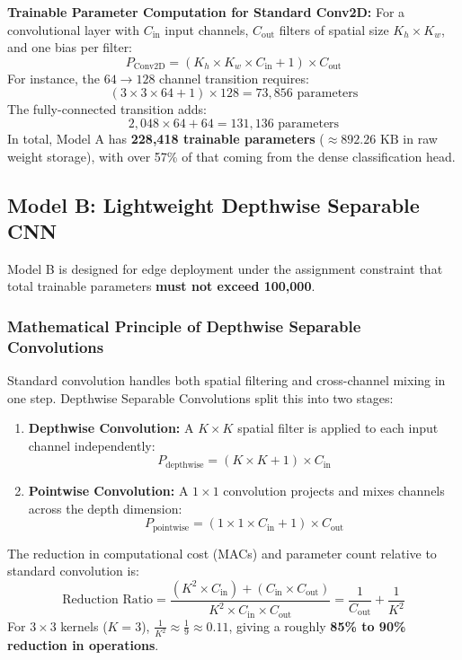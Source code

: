 \documentclass[11pt]{article}
\begin{document}
	\textbf{Trainable Parameter Computation for Standard Conv2D:}
	For a convolutional layer with $C_{\text{in}}$ input channels, $C_{\text{out}}$ filters of spatial size $K_h \times K_w$, and one bias per filter:
	\begin{equation}
		P_{\text{Conv2D}} = (K_h \times K_w \times C_{\text{in}} + 1) \times C_{\text{out}}
	\end{equation}
	For instance, the $64 \to 128$ channel transition requires:
	$$(3 \times 3 \times 64 + 1) \times 128 = 73,856 \text{ parameters}$$
	The fully-connected transition adds:
	$$2,048 \times 64 + 64 = 131,136 \text{ parameters}$$
	In total, Model A has \textbf{228,418 trainable parameters} ($\approx 892.26\text{ KB}$ in raw weight storage), with over 57\% of that coming from the dense classification head.

	\subsection{Model B: Lightweight Depthwise Separable CNN}
	Model B is designed for edge deployment under the assignment constraint that total trainable parameters \textbf{must not exceed 100,000}.
	
	\subsubsection{Mathematical Principle of Depthwise Separable Convolutions}
	Standard convolution handles both spatial filtering and cross-channel mixing in one step. Depthwise Separable Convolutions split this into two stages:
	\begin{enumerate}
		\item \textbf{Depthwise Convolution:} A $K \times K$ spatial filter is applied to each input channel independently:
		\begin{equation}
			P_{\text{depthwise}} = (K \times K + 1) \times C_{\text{in}}
		\end{equation}
		\item \textbf{Pointwise Convolution:} A $1 \times 1$ convolution projects and mixes channels across the depth dimension:
		\begin{equation}
			P_{\text{pointwise}} = (1 \times 1 \times C_{\text{in}} + 1) \times C_{\text{out}}
		\end{equation}
	\end{enumerate}
	The reduction in computational cost (MACs) and parameter count relative to standard convolution is:
	\begin{equation}
		\text{Reduction Ratio} = \frac{(K^2 \times C_{\text{in}}) + (C_{\text{in}} \times C_{\text{out}})}{K^2 \times C_{\text{in}} \times C_{\text{out}}} = \frac{1}{C_{\text{out}}} + \frac{1}{K^2}
	\end{equation}
	For $3 \times 3$ kernels ($K=3$), $\frac{1}{K^2} \approx \frac{1}{9} \approx 0.11$, giving a roughly \textbf{85\% to 90\% reduction in operations}.
\end{document}
